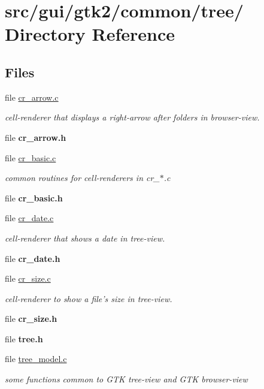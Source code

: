 \hypertarget{dir_000015}{
\section{src/gui/gtk2/common/tree/ Directory Reference}
\label{dir_000015}
}
\subsection*{Files}
\begin{CompactItemize}
\item 
file \hyperlink{cr__arrow_8c}{cr\_\-arrow.c}
\begin{CompactList}\small\item\em cell-renderer that displays a right-arrow after folders in browser-view. \item\end{CompactList}

\item 
file {\bf cr\_\-arrow.h}
\item 
file \hyperlink{cr__basic_8c}{cr\_\-basic.c}
\begin{CompactList}\small\item\em common routines for cell-renderers in cr\_\-$\ast$.c \item\end{CompactList}

\item 
file {\bf cr\_\-basic.h}
\item 
file \hyperlink{cr__date_8c}{cr\_\-date.c}
\begin{CompactList}\small\item\em cell-renderer that shows a date in tree-view. \item\end{CompactList}

\item 
file {\bf cr\_\-date.h}
\item 
file \hyperlink{cr__size_8c}{cr\_\-size.c}
\begin{CompactList}\small\item\em cell-renderer to show a file's size in tree-view. \item\end{CompactList}

\item 
file {\bf cr\_\-size.h}
\item 
file {\bf tree.h}
\item 
file \hyperlink{tree__model_8c}{tree\_\-model.c}
\begin{CompactList}\small\item\em some functions common to GTK tree-view and GTK browser-view \item\end{CompactList}

\end{CompactItemize}
